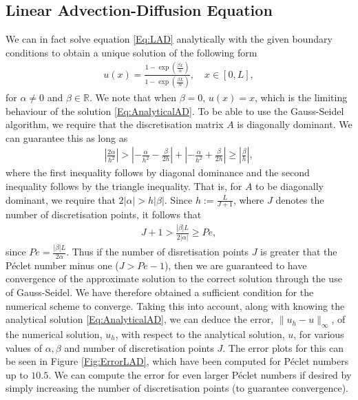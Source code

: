 \documentclass[a4paper,11pt]{article}
\theoremstyle{break}
\theoremstyle{break2}
\theoremstyle{break}
\theoremstyle{break2}
\newcommand{\R}{\mathbb{R}}
\begin{document}
\subsection{Linear Advection-Diffusion Equation}
We can in fact solve equation \eqref{Eq:LAD} analytically with the given boundary conditions to obtain a unique solution of the following form
\begin{align}\label{Eq:AnalyticalAD}
u(x) = \frac{1 - \exp\left(\frac{\beta x}{\alpha}\right)}{1 - \exp\left(\frac{\beta L}{\alpha}\right)}, \quad x \in [0,L],
\end{align}
for $ \alpha \neq 0 $ and $ \beta \in \R $. We note that when $ \beta = 0 $, $ u(x) = x $, which is the limiting behaviour of the solution \eqref{Eq:AnalyticalAD}.
To be able to use the Gauss-Seidel algorithm, we require that the discretisation matrix $ A $ is diagonally dominant. We can guarantee this as long as
\begin{align*}
\left|\frac{2\alpha}{h^2}\right| > \left|-\frac{\alpha}{h^2} - \frac{\beta}{2h}\right| + \left|-\frac{\alpha}{h^2} + \frac{\beta}{2h}\right| \geq \left|\frac{\beta}{h}\right|,
\end{align*}
where the first inequality follows by diagonal dominance and the second inequality follows by the triangle inequality. That is, for $ A $ to be diagonally dominant, we require that $ 2|\alpha| > h|\beta| $. Since $ h := \frac{L}{J+1} $, where $ J $ denotes the number of discretisation points, it follows that
\begin{align*}
J+1 > \frac{|\beta|L}{2|\alpha|} \geq Pe, 
\end{align*}
since $ Pe = \frac{|\beta|L}{2\alpha} $. Thus if the number of disretisation points $ J $ is greater that the P\'{e}clet number minus one ($ J > Pe - 1 $), then we are guaranteed to have convergence of the approximate solution to the correct solution through the use of Gauss-Seidel. We have therefore obtained a sufficient condition for the numerical scheme to converge. Taking this into account, along with knowing the analytical solution \eqref{Eq:AnalyticalAD}, we can deduce the error, $ \|u_h - u\|_{\infty} $, of the numerical solution, $ u_h $, with respect to the analytical solution, $ u $, for various values of $ \alpha, \beta $ and number of discretisation points $ J $. The error plots for this can be seen in Figure \ref{Fig:ErrorLAD}, which have been computed for P\'{e}clet numbers up to $ 10.5 $. We can compute the error for even larger P\'{e}clet numbers if desired by simply increasing the number of discretisation points (to guarantee convergence).
\end{document}
